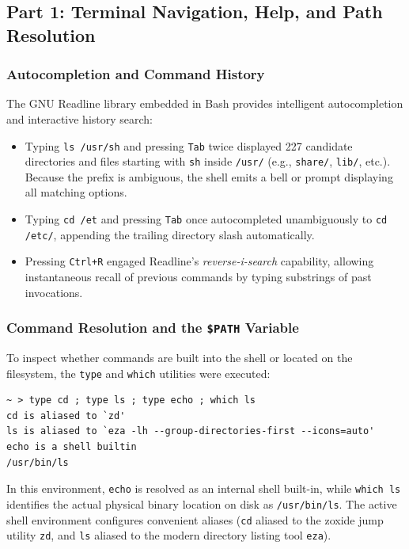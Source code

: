 \documentclass[12pt,a4paper]{article}
\begin{document}
\subsection{Part 1: Terminal Navigation, Help, and Path Resolution}

\subsubsection{Autocompletion and Command History}
The GNU Readline library embedded in Bash provides intelligent autocompletion and interactive history search:
\begin{itemize}
    \item Typing \texttt{ls /usr/sh} and pressing \texttt{Tab} twice displayed 227 candidate directories and files starting with \texttt{sh} inside \texttt{/usr/} (e.g., \texttt{share/}, \texttt{lib/}, etc.). Because the prefix is ambiguous, the shell emits a bell or prompt displaying all matching options.
    \item Typing \texttt{cd /et} and pressing \texttt{Tab} once autocompleted unambiguously to \texttt{cd /etc/}, appending the trailing directory slash automatically.
    \item Pressing \texttt{Ctrl+R} engaged Readline's \textit{reverse-i-search} capability, allowing instantaneous recall of previous commands by typing substrings of past invocations.
\end{itemize}

\subsubsection{Command Resolution and the \texttt{\$PATH} Variable}
To inspect whether commands are built into the shell or located on the filesystem, the \texttt{type} and \texttt{which} utilities were executed:

\begin{lstlisting}[style=consolestyle, caption={Inspection of command resolution and binary paths}]
~ > type cd ; type ls ; type echo ; which ls
cd is aliased to `zd'
ls is aliased to `eza -lh --group-directories-first --icons=auto'
echo is a shell builtin
/usr/bin/ls
\end{lstlisting}

In this environment, \texttt{echo} is resolved as an internal shell built-in, while \texttt{which ls} identifies the actual physical binary location on disk as \texttt{/usr/bin/ls}. The active shell environment configures convenient aliases (\texttt{cd} aliased to the zoxide jump utility \texttt{zd}, and \texttt{ls} aliased to the modern directory listing tool \texttt{eza}).
\end{document}
